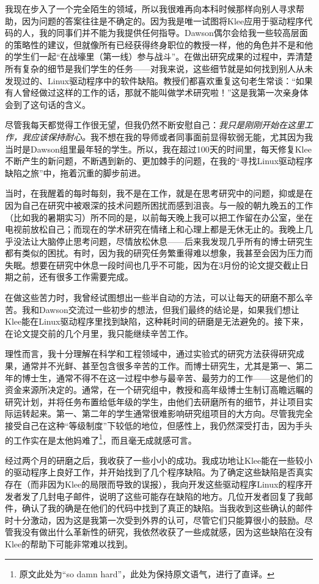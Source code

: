\documentclass[letter,12pt]{book}
\begin{document}
\begin{CJK}{UTF8}{gbsn}
我现在步入了一个完全陌生的领域，所以我很难再向本科时候那样向别人寻求帮助，因为问题的答案往往是不确定的。因为我是唯一试图将Klee应用于驱动程序代码的人，我的同事们并不能为我提供任何指导。Dawson偶尔会给我一些较高层面的策略性的建议，但就像所有已经获得终身职位的教授一样，他的角色并不是和他的学生们一起“在战壕里（第一线）参与战斗”。在做出研究成果的过程中，弄清楚所有复杂的细节是我们学生的任务——对我来说，这些细节就是如何找到别人从未发现过的、Linux驱动程序中的软件缺陷。教授们都喜欢重复这句老生常谈：“如果有人曾经做过这样的工作的话，那就不能叫做学术研究啦！”这是我第一次亲身体会到了这句话的含义。

尽管我每天都觉得工作很无望，但我仍然不断安慰自己：\emph{我只是刚刚开始在这里工作，我应该保持耐心。}我不想在我的导师或者同事面前显得软弱无能，尤其因为我当时是Dawson组里最年轻的学生。所以，我在超过100天的时间里，每天修复Klee不断产生的新问题，不断遇到新的、更加棘手的问题，在我的“寻找Linux驱动程序缺陷之旅”中，拖着沉重的脚步前进。

当时，在我醒着的每时每刻，我不是在工作，就是在思考研究中的问题，抑或是在因为自己在研究中被艰深的技术问题所困扰而感到沮丧。与一般的朝九晚五的工作（比如我的暑期实习）所不同的是，以前每天晚上我可以把工作留在办公室，坐在电视前放松自己；而现在的学术研究在情绪上和心理上都是无休无止的。我晚上几乎没法让大脑停止思考问题，尽情放松休息——后来我发现几乎所有的博士研究生都有类似的困扰。有时，因为我的研究任务繁重得难以想象，我甚至会因为压力而失眠。想要在研究中休息一段时间也几乎不可能，因为在3月份的论文提交截止日期之前，还有很多工作需要完成。

在做这些苦力时，我曾经试图想出一些半自动的方法，可以让每天的研磨不那么辛苦。我和Dawson交流过一些初步的想法，但我们最终的结论是，如果我们想让Klee能在Linux驱动程序里找到缺陷，这种耗时间的研磨是无法避免的。接下来，在论文提交前的几个月里，我只能继续辛苦工作。

理性而言，我十分理解在科学和工程领域中，通过实验式的研究方法获得研究成果，通常并不光鲜、甚至包含很多辛苦的工作。而博士研究生，尤其是第一、第二年的博士生，通常不得不在这一过程中参与最辛苦、最劳力的工作——这是他们的资金来源所决定的。通常，在一个研究组中，教授和高年级博士生制订高瞻远瞩的研究计划，并将任务布置给低年级的学生，由他们去研磨所有的细节，并让项目实际运转起来。第一、第二年的学生通常很难影响研究组项目的大方向。尽管我完全接受自己在这种“等级制度”下较低的地位，但感性上，我仍然深受打击，因为手头的工作实在是太他妈难了\footnote{原文此处为“so damn hard”，此处为保持原文语气，进行了直译。}，而且毫无成就感可言。

\breakline

经过两个月的研磨之后，我收获了一些小小的成功。我成功地让Klee能在一些较小的驱动程序上良好工作，并开始找到了几个程序缺陷。为了确定这些缺陷是否真实存在（而非因为Klee的局限而导致的误报），我向开发这些驱动程序Linux的程序开发者发了几封电子邮件，说明了这些可能存在缺陷的地方。几位开发者回复了我邮件，确认了我的确是在他们的代码中找到了真正的缺陷。当我收到这些确认的邮件时十分激动，因为这是我第一次受到外界的认可，尽管它们只能算很小的鼓励。尽管我没有做出什么革新性的研究，我依然收获了一些成就感，因为这些缺陷在没有Klee的帮助下可能非常难以找到。


\end{CJK}
\end{document}

